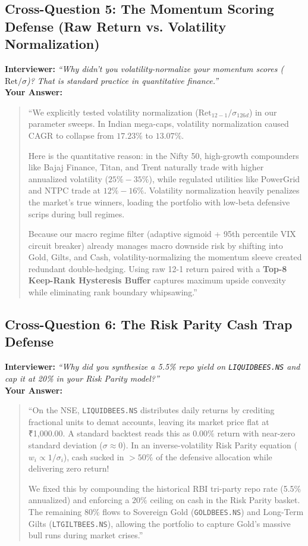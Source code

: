 \documentclass[11pt,a4paper]{article}
\begin{document}
\subsection{Cross-Question 5: The Momentum Scoring Defense (Raw Return vs. Volatility Normalization)}
\textbf{Interviewer:} \textit{``Why didn't you volatility-normalize your momentum scores ($\text{Ret} / \sigma$)? That is standard practice in quantitative finance.''} \\
\textbf{Your Answer:}
\begin{quote}
``We explicitly tested volatility normalization ($\text{Ret}_{12-1} / \sigma_{126d}$) in our parameter sweeps. In Indian mega-caps, volatility normalization caused CAGR to collapse from $17.23\%$ to $13.07\%$. 

Here is the quantitative reason: in the Nifty 50, high-growth compounders like Bajaj Finance, Titan, and Trent naturally trade with higher annualized volatility ($25\% - 35\%$), while regulated utilities like PowerGrid and NTPC trade at $12\% - 16\%$. Volatility normalization heavily penalizes the market's true winners, loading the portfolio with low-beta defensive scrips during bull regimes. 

Because our macro regime filter (adaptive sigmoid + 95th percentile VIX circuit breaker) already manages macro downside risk by shifting into Gold, Gilts, and Cash, volatility-normalizing the momentum sleeve created redundant double-hedging. Using raw 12-1 return paired with a \textbf{Top-8 Keep-Rank Hysteresis Buffer} captures maximum upside convexity while eliminating rank boundary whipsawing.''
\end{quote}

\subsection{Cross-Question 6: The Risk Parity Cash Trap Defense}
\textbf{Interviewer:} \textit{``Why did you synthesize a 5.5\% repo yield on \texttt{LIQUIDBEES.NS} and cap it at 20\% in your Risk Parity model?''} \\
\textbf{Your Answer:}
\begin{quote}
``On the NSE, \texttt{LIQUIDBEES.NS} distributes daily returns by crediting fractional units to demat accounts, leaving its market price flat at ₹1,000.00. A standard backtest reads this as $0.00\%$ return with near-zero standard deviation ($\sigma \approx 0$). In an inverse-volatility Risk Parity equation ($w_i \propto 1/\sigma_i$), cash sucked in $>50\%$ of the defensive allocation while delivering zero return! 

We fixed this by compounding the historical RBI tri-party repo rate (5.5\% annualized) and enforcing a $20\%$ ceiling on cash in the Risk Parity basket. The remaining $80\%$ flows to Sovereign Gold (\texttt{GOLDBEES.NS}) and Long-Term Gilts (\texttt{LTGILTBEES.NS}), allowing the portfolio to capture Gold's massive bull runs during market crises.''
\end{quote}
\end{document}
